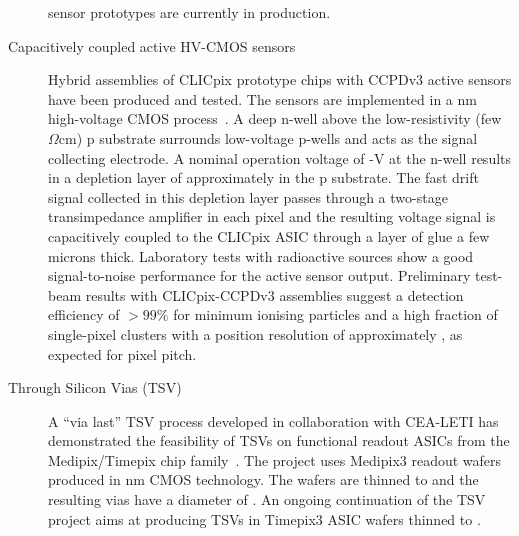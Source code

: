 \begin{description}
sensor prototypes are currently in production.
\item[Capacitively coupled active HV-CMOS sensors]
Hybrid assemblies of CLICpix prototype chips with CCPDv3 active sensors
have been produced and tested.
The sensors are implemented in
a \unit[180]{nm} high-voltage CMOS process~\cite{Peric2013131}. A deep n-well above the low-resistivity
(few $\Omega$cm) p substrate
surrounds low-voltage p-wells and acts as the signal collecting electrode.
A nominal operation voltage of -\unit[60]{V} at the
n-well results in a depletion layer of approximately \unit[10--20]{\micron} in the p substrate.
 The fast drift signal collected in this
depletion layer passes through a two-stage transimpedance
amplifier in each pixel and the resulting voltage signal is capacitively coupled to the CLICpix
ASIC through a layer of glue a few microns thick.
Laboratory tests with radioactive sources show a good signal-to-noise performance for the
active sensor output. Preliminary test-beam results with CLICpix-CCPDv3 assemblies suggest a
detection efficiency of $>99\%$ for minimum ionising particles and a high fraction of
single-pixel clusters with a position resolution of
approximately \unit[7]{\micron}, as expected for \unit[25]{\micron} pixel pitch.
\item[Through Silicon Vias (TSV)]
A ``via last'' TSV process developed in collaboration with
CEA-LETI has demonstrated the feasibility of TSVs on functional
readout ASICs from the Medipix/Timepix chip family~\cite{6575630}.
The project uses Medipix3 readout wafers produced in \unit[130]{nm} CMOS
technology. The wafers are thinned to \unit[120]{\micron} and the resulting vias
have a diameter of \unit[60]{\micron}.
An ongoing  continuation of the TSV project aims at producing
TSVs in Timepix3 ASIC wafers thinned to \unit[50]{\micron}.
\end{description}
